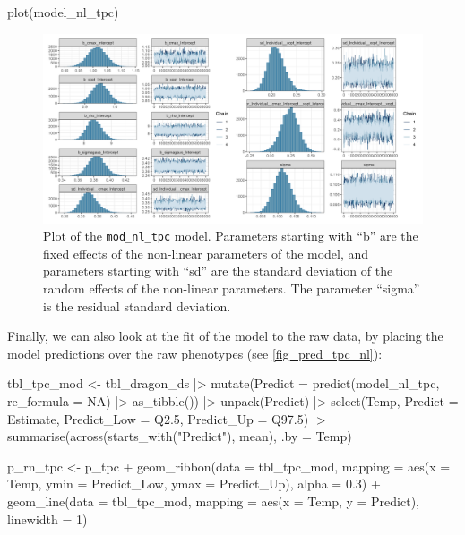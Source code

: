 \documentclass[a4paper,12pt,twoside]{article}
\begin{document}
\begin{Rinput}
plot(model_nl_tpc)
\end{Rinput}
%
\begin{figure}[t!h!]
  \includegraphics[width = \textwidth]{TPC_nl_model_ds.png}
  \caption{Plot of the \texttt{mod\_nl\_tpc} model. Parameters starting with ``b'' are the fixed effects of the non-linear parameters of the model, and parameters starting with ``sd'' are the standard deviation of the random effects of the non-linear parameters. The parameter ``sigma'' is the residual standard deviation.}
  \label{fig_mod_tpc_nl}
\end{figure}
%
Finally, we can also look at the fit of the model to the raw data, by placing the model predictions over the raw phenotypes (see \autoref{fig_pred_tpc_nl}):
\begin{Rinput}
tbl_tpc_mod <-
    tbl_dragon_ds |>
    mutate(Predict = predict(model_nl_tpc, re_formula = NA) |>
                     as_tibble()) |>
    unpack(Predict) |>
    select(Temp,
           Predict = Estimate,
           Predict_Low = Q2.5,
           Predict_Up  = Q97.5) |>
    summarise(across(starts_with("Predict"), mean),
              .by = Temp)

p_rn_tpc <-
    p_tpc +
    geom_ribbon(data = tbl_tpc_mod,
                mapping = aes(x = Temp, ymin = Predict_Low, ymax = Predict_Up),
                alpha = 0.3) +
    geom_line(data = tbl_tpc_mod,
              mapping = aes(x = Temp, y = Predict),
              linewidth = 1)
\end{Rinput}
%
\end{document}

